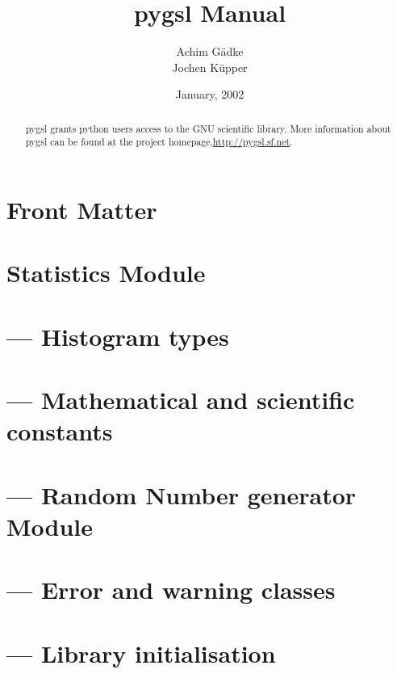 \documentclass{manual}
\title{pygsl Manual}
\author{Achim G\"adke\raisebox{1ex}{\footnotesize{1)}}\\
Jochen K\"upper}
\date{January, 2002}            %
\begin{document}
\maketitle

\ifhtml
\chapter*{Front Matter}
\label{front}
\fi



\begin{abstract}
   \noindent
   pygsl grants python users access to the GNU scientific library.
   More information about pygsl can be found at the project
   homepage,\url{http://pygsl.sf.net}.
\end{abstract}

\tableofcontents


\chapter{Statistics Module}
\label{cha:statistics-module}


\chapter{\protect{} --- Histogram types}
\label{cha:histogram-module}


\chapter{\protect{} --- Mathematical and scientific constants}
\label{cha:const-module}


\chapter{\protect{} --- Random Number generator Module}
\label{cha:rng-module}


\chapter{\protect{} --- Error and warning classes}
\label{cha:error-module}


\chapter{\protect{} --- Library initialisation}
\label{cha:library-initialisation}



\end{document}
